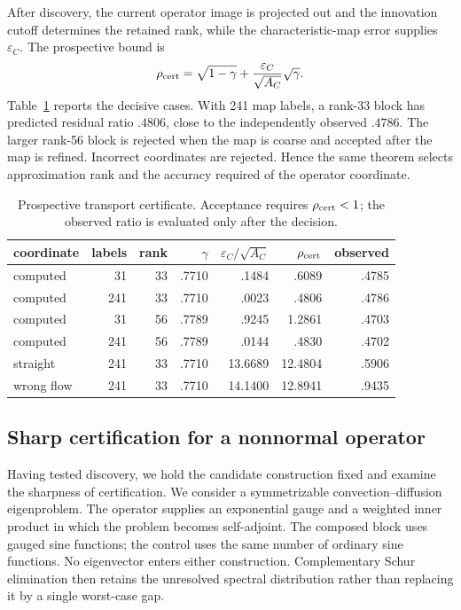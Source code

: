 \documentclass[11pt]{article}
\numberwithin{algorithm}{section}
\theoremstyle{definition}\newtheorem{definition}[theorem]{Definition}
\theoremstyle{remark}\newtheorem{remark}[theorem]{Remark}
\begin{document}
After discovery, the current operator image is projected out and the
innovation cutoff determines the retained rank, while the characteristic-map
error supplies $\varepsilon_C$.  The prospective bound is
\[
 \rho_{\rm cert}=\sqrt{1-\gamma}
 +\frac{\varepsilon_C}{\sqrt{A_C}}\sqrt{\gamma}.
\]
Table~\ref{tab:main-transport} reports the decisive cases.  With 241 map
labels, a rank-33 block has predicted residual ratio $.4806$, close to the
independently observed $.4786$.  The larger rank-56 block is rejected when
the map is coarse and accepted after the map is refined.  Incorrect
coordinates are rejected.  Hence the same theorem selects approximation rank
and the accuracy required of the operator coordinate.

\begin{table}[H]
\centering
\caption{Prospective transport certificate.  Acceptance requires
$\rho_{\rm cert}<1$; the observed ratio is evaluated only after the decision.}
\label{tab:main-transport}
\begin{tabular}{lrrrrrr}
\toprule
coordinate & labels & rank & $\gamma$ &
$\varepsilon_C/\sqrt{A_C}$ & $\rho_{\rm cert}$ & observed\\
\midrule
computed & 31  & 33 & .7710 & .1484 & .6089 & .4785\\
computed & 241 & 33 & .7710 & .0023 & .4806 & .4786\\
computed & 31  & 56 & .7789 & .9245 & 1.2861 & .4703\\
computed & 241 & 56 & .7789 & .0144 & .4830 & .4702\\
straight & 241 & 33 & .7710 & 13.6689 & 12.4804 & .5906\\
wrong flow & 241 & 33 & .7710 & 14.1400 & 12.8941 & .9435\\
\bottomrule
\end{tabular}
\end{table}

\subsection{Sharp certification for a nonnormal operator}
Having tested discovery, we hold the candidate construction fixed and examine
the sharpness of certification.  We consider a symmetrizable
convection--diffusion eigenproblem.  The
operator supplies an exponential gauge and a weighted inner product in which
the problem becomes self-adjoint.  The composed block uses gauged sine
functions; the control uses the same number of ordinary sine functions.  No
eigenvector enters either construction.  Complementary Schur elimination
then retains the unresolved spectral distribution rather than replacing it by
a single worst-case gap.
\end{document}
